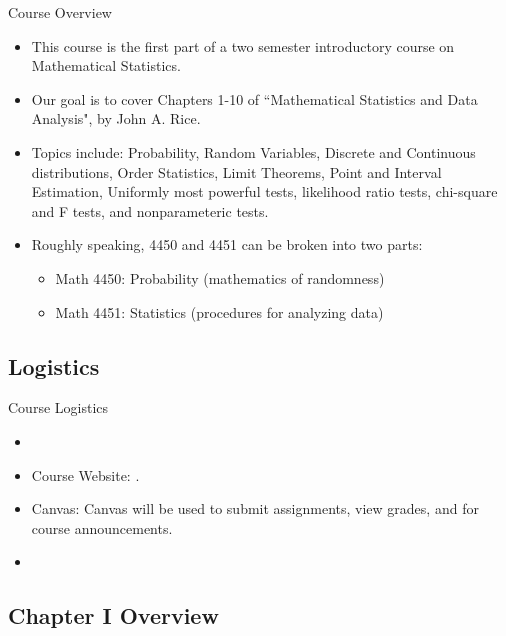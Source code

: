 \begin{frame}{Course Overview}
  \begin{itemize}
  \item This course is the first part of a two semester introductory course on Mathematical Statistics.
  \item Our goal is to cover Chapters 1-10 of ``Mathematical Statistics and Data Analysis", by John A. Rice.
  \item Topics include: Probability, Random Variables, Discrete and Continuous distributions, Order Statistics, Limit Theorems, Point and Interval Estimation, Uniformly most powerful tests, likelihood ratio tests, chi-square and F tests, and nonparameteric tests.
  \item Roughly speaking, 4450 and 4451 can be broken into two parts: 
  \begin{itemize}
    \item Math 4450: Probability (mathematics of randomness)
    \item Math 4451: Statistics (procedures for analyzing data)
  \end{itemize}
  \end{itemize}
\end{frame}

\subsection{Logistics}

\begin{frame}{Course Logistics}
  \begin{itemize}
    \item {}
    \item Course Website: . 
    \item Canvas: Canvas will be used to submit assignments, view grades, and for course announcements.
    \item {}
  \end{itemize}
\end{frame}

\subsection{Chapter I Overview}

